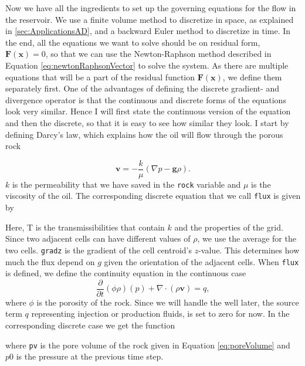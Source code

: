 Now we have all the ingredients to set up the governing equations for the flow in the reservoir. We use a finite volume method to discretize in space, as explained in \autoref{sec:ApplicationsAD}, and a backward Euler method to discretize in time. In the end, all the equations we want to solve should be on residual form, $\boldsymbol{F}(\boldsymbol{x}) = 0$, so that we can use the Newton-Raphson method described in Equation \eqref{eq:newtonRaphsonVector} to solve the system. As there are multiple equations that will be a part of the residual function $\boldsymbol{F}(\boldsymbol{x})$, we define them separately first. One of the advantages of defining the discrete gradient- and divergence operator is that the continuous and discrete forms of the equations look very similar. Hence I will first state the continuous version of the equation and then the discrete, so that it is easy to see how similar they look. I start by defining Darcy's law, which explains how the oil will flow through the porous rock

\begin{equation*}
    \textbf{v} = - \frac{k}{\mu}(\nabla p - \textbf{g}\rho).
    \label{eq:pressSolverDarcy}
\end{equation*}
$k$ is the permeability that we have saved in the \texttt{rock} variable and $\mu$ is the viscosity of the oil.
The corresponding discrete equation that we call \texttt{flux} is given by 

Here, T is the transmissibilities that contain $k$ and the properties of the grid. Since two adjacent cells can have different values of $\rho$, we use the  average for the two cells. \texttt{gradz} is the gradient of the cell centroid's $z$-value. This determines how much the flux depend on $g$ given the orientation of the adjacent cells. When \texttt{flux} is defined, we define the continuity equation in the continuous case
\begin{equation*}
    \frac{\partial}{\partial t}(\phi\rho)(p) + \nabla\cdot(\rho\textbf{v}) = q,
\end{equation*}
where $\phi$ is the porosity of the rock. Since we will handle the well later, the source term $q$ representing injection or production fluids, is set to zero for now. In the corresponding discrete case we get the function

where \texttt{pv} is the pore volume of the rock given in Equation \eqref{eq:poreVolume} and $p0$ is the pressure at the previous time step. 

